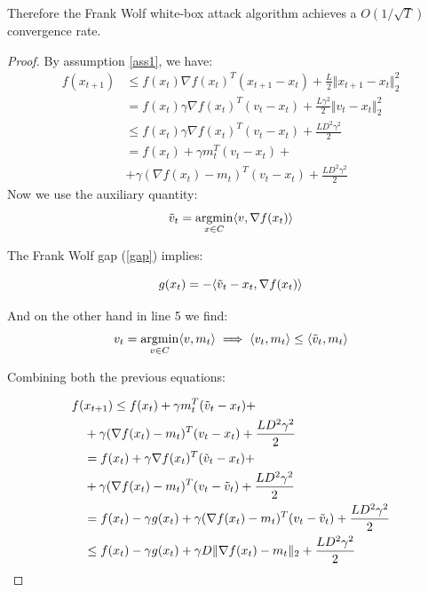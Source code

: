 \documentclass[10pt,twocolumn,letterpaper, english]{article}
\newcommand{\argmin}{\mathop{\mathrm{argmin}}}
\theoremstyle{definition}
\theoremstyle{plain}
\theoremstyle{plain}
\theoremstyle{plain}
\theoremstyle{plain}
\theoremstyle{remark}
\theoremstyle{remark}
\theoremstyle{definition}
\theoremstyle{definition}
\theoremstyle{definition}
\theoremstyle{definition}
\begin{document}
Therefore the Frank Wolf white-box attack algorithm achieves a $O(1/\sqrt{T})$ convergence rate.

\begin{proof}

By assumption \ref{ass1}, we have:
\begin{align*}
    f(x_{t+1}) & \le f(x_t) \nabla f(x_t)^T ( x_{t+1} - x_t) + \frac{L}{2} \Vert x_{t+1} - x_t \Vert_{2}^2 \\
    &= f(x_t) \gamma \nabla f(x_t)^T ( v_t - x_t) + \frac{L \gamma^2}{2} \Vert v_t - x_t \Vert_{2}^2\\
    & \le f(x_t) \gamma \nabla f(x_t)^T ( v_t - x_t) + \frac{L D^2 \gamma^2}{2}\\
    &= f(x_t) + \gamma m_{t}^T ( v_t - x_t) +\\
    &+ \gamma(\nabla f(x_t) - m_t)^T (v_t - x_t) + \frac{L D^2 \gamma^2}{2} 
\end{align*}
Now we use the auxiliary quantity:
\begin{equation*}
    \Tilde{v}_t = \argmin_{x \in C} \langle v, \nabla f(x_t) \rangle 
\end{equation*}

The Frank Wolf gap (\ref{gap}) implies:

\begin{equation*}
    g(x_t)= - \langle \Tilde{v}_t -x_t, \nabla f(x_t) \rangle 
\end{equation*}

And on the other hand in line 5 we find:
\begin{equation*}
    v_t= \argmin_{v \in C}\langle v,m_t \rangle \implies \langle v_t,m_t \rangle  \le  \langle \Tilde{v}_t, m_t \rangle 
\end{equation*}

Combining both the previous equations:

\begin{align*}
    f(& x_{t+1}) \le f(x_t) + \gamma m_{t}^T ( \Tilde{v}_t - x_t) +\\
    & + \gamma (\nabla f(x_t) - m_t)^T (v_t - x_t) + \frac{L D^2 \gamma^2}{2} \\
    & = f(x_t) + \gamma \nabla f(x_t)^T (\Tilde{v}_t - x_t) + \\
    &+ \gamma (\nabla f(x_t) - m_t)^T (v_t - \Tilde{v}_t) + \frac{L D^2 \gamma^2}{2}\\
    &= f(x_t) - \gamma g(x_t) + \gamma (\nabla f(x_t) - m_t)^T (v_t - \Tilde{v}_t) + \frac{L D^2 \gamma^2}{2} \\
    & \le  f(x_t) - \gamma g(x_t) + \gamma D \Vert \nabla f(x_t) - m_t \Vert_2 + \frac{L D^2 \gamma^2}{2}
\end{align*}


\end{proof}
\end{document}
